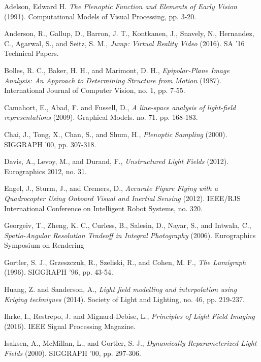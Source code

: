 \documentclass[12pt]{report}
\begin{document}
\begin{thebibliography}{10}%

	Adelson, Edward H. \emph{The Plenoptic Function and Elements of Early Vision} (1991). Computational Models of Visual Processing, pp. 3-20.

	Anderson, R., Gallup, D., Barron, J. T., Kontkanen, J., Snavely,  N., Hernandez, C., Agarwal, S., and Seitz, S. M., \emph{Jump: Virtual Reality Video} (2016). SA '16 Technical Papers.

	Bolles, R. C., Baker, H. H., and Marimont, D. H., \emph{Epipolar-Plane Image Analysis: An Approach to Determining Structure from Motion} (1987). International Journal of Computer Vision, no. 1, pp. 7-55. 

	Camahort, E., Abad, F. and Fussell, D., \emph{A line-space analysis of light-field representations} (2009). Graphical Models. no. 71. pp. 168-183.

	Chai, J., Tong, X., Chan, S., and Shum, H., \emph{Plenoptic Sampling} (2000). SIGGRAPH '00, pp. 307-318.

	Davis, A., Levoy, M., and Durand, F., \emph{Unstructured Light Fields} (2012). Eurographics 2012, no. 31.

	Engel, J., Sturm, J., and Cremers, D., \emph{Accurate Figure Flying with a Quadrocopter Using Onboard Visual and Inertial Sensing} (2012). IEEE/RJS International Conference on Intelligent Robot Systems, no. 320.

	Georgeiv, T., Zheng, K. C., Curless, B., Salesin, D., Nayar, S., and Intwala, C., \emph{Spatio-Angular Resolution Tradeoff in Integral Photography} (2006). Eurographics Symposium on Rendering

	Gortler, S. J., Grzeszczuk, R., Szeliski, R., and Cohen, M. F., \emph{The Lumigraph} (1996). SIGGRAPH '96, pp. 43-54.
	
	Huang, Z. and Sanderson, A., \emph{Light field modelling and interpolation using Kriging techniques}	(2014). Society of Light and Lighting, no. 46, pp. 219-237.
	
	Ihrke, I., Restrepo, J. and Mignard-Debise, L., \emph{Principles of Light Field Imaging} (2016). IEEE Signal Processing Magazine.
	
	Isaksen, A., McMillan, L., and Gortler, S. J., \emph{Dynamically Reparameterized Light Fields} (2000). SIGGRAPH '00, pp. 297-306.


\end{thebibliography}
\end{document}
